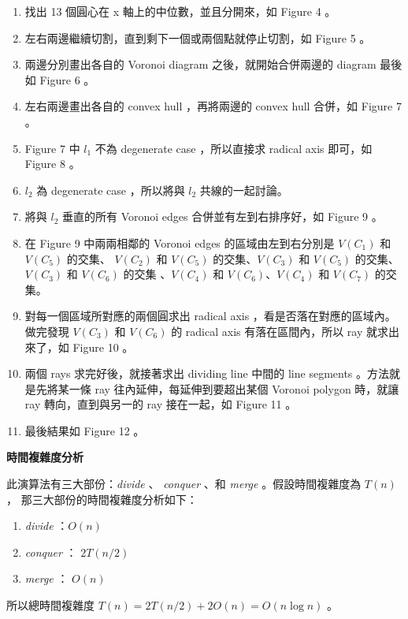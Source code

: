 \documentclass[12pt]{article}
\begin{document}
\begin{CJK}{UTF8}{bkai}
\begin{enumerate}
\item 找出 13 個圓心在 x 軸上的中位數，並且分開來，如 Figure 4 。
\item 左右兩邊繼續切割，直到剩下一個或兩個點就停止切割，如 Figure 5 。
\item 兩邊分別畫出各自的 Voronoi diagram 之後，就開始合併兩邊的 diagram
最後如 Figure 6 。
\item 左右兩邊畫出各自的 convex hull ，再將兩邊的 convex hull 合併，如 Figure 7 。
\item Figure 7 中 $l_1$ 不為 degenerate case ，所以直接求 radical axis 即可，如
 Figure 8 。
\item $l_2$ 為 degenerate case ，所以將與 $l_2$ 共線的一起討論。
\item 將與 $l_2$ 垂直的所有 Voronoi edges 合併並有左到右排序好，如 Figure 9 。
\item 在 Figure 9 中兩兩相鄰的 Voronoi edges 的區域由左到右分別是 $V(C_1)$ 和 $V(C_5)$ 的交集、
 $V(C_2)$ 和 $V(C_5)$ 的交集、$V(C_3)$ 和 $V(C_5)$ 的交集、 $V(C_3)$ 和 $V(C_6)$ 的交集
、$V(C_4)$ 和 $V(C_6)$、$V(C_4)$ 和 $V(C_7)$ 的交集。
\item 對每一個區域所對應的兩個圓求出 radical axis ，看是否落在對應的區域內。做完發現
 $V(C_3)$ 和 $V(C_6)$ 的 radical axis 有落在區間內，所以 ray 就求出來了，如 Figure 10 。
\item 兩個 rays 求完好後，就接著求出 dividing line 中間的 line segments 。方法就是先將某一條
 ray 往內延伸，每延伸到要超出某個 Voronoi polygon 時，就讓 ray 轉向，直到與另一的 ray 接在一起，如 Figure 11 。
\item 最後結果如 Figure 12 。

\end{enumerate}

\centerline{\bf 時間複雜度分析}

此演算法有三大部份：{\it divide} 、 {\it conquer} 、和 {\it merge} 。假設時間複雜度為 $T(n)$，
那三大部份的時間複雜度分析如下：\\

\begin{enumerate}
\item {\it divide} ：$O(n)$\\
\item {\it conquer} ： $2T(n/2)$\\
\item {\it merge} ： $O(n)$\\
\end{enumerate}

所以總時間複雜度 $T(n)=2T(n/2)+2O(n)=O(n\log n)$ 。



\end{CJK}
\end{document}
